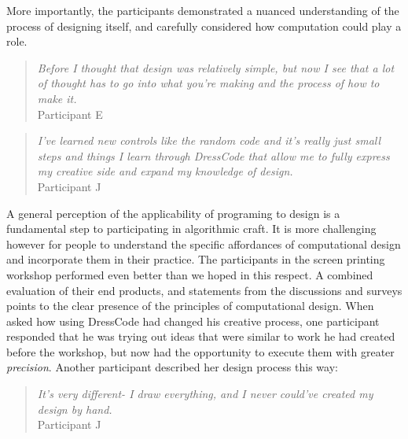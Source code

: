 \documentclass{sigchi}
\begin{document}
More importantly, the participants demonstrated a nuanced understanding of the process of designing itself, and carefully considered how computation could play a role. 
\begin{quotation}
	\textit{Before I thought that design was relatively simple, but now I see that a lot of thought has to go into what you're making and the process of how to make it.}
		\\Participant E
	\end{quotation}

\begin{quotation}
	\textit{I've learned new controls like the random code and it's really just small steps and things I learn through DressCode that allow me to fully express my creative side and expand my knowledge of design.}
	\\Participant J
\end{quotation}

A general perception of the applicability of programing to design is a fundamental step to participating in algorithmic craft. It is more challenging however for people to understand the specific affordances of computational design and incorporate them in their practice. The participants in the screen printing workshop performed even better than we hoped in this respect. A combined evaluation of their end products, and statements from the discussions and surveys points to the clear presence of the principles of computational design. When asked how using DressCode had changed his creative process, one participant responded that he was trying out ideas that were similar to work he had created before the workshop, but now had the opportunity to execute them with greater \textit{precision}. Another participant described her design process this way:
\begin{quotation}
	\textit{It's very different- I draw everything, and I never could've created my design by hand.}
	\\Participant J
\end{quotation}
\end{document}

